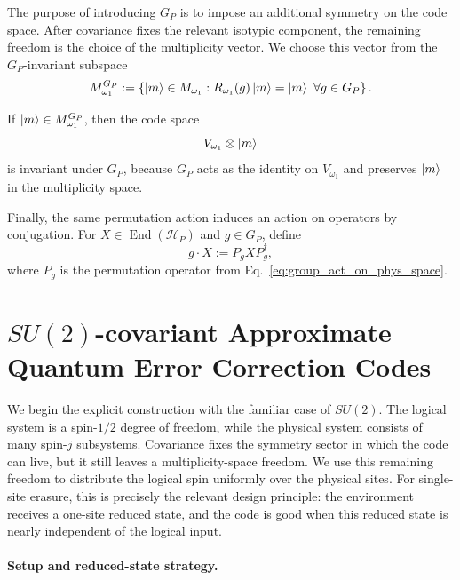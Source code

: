\documentclass[10pt,twocolumn,superscriptaddress,aps,amsmath,amssymb,citeautoscript,floatfix,prx]{revtex4-2}
\theoremstyle{plain}
\theoremstyle{plain}
\theoremstyle{plain}
\theoremstyle{plain}
\theoremstyle{plain}
\theoremstyle{plain}
\begin{document}
The purpose of introducing $G_P$ is to impose an additional symmetry on the code space. After covariance fixes the relevant isotypic component, the remaining freedom is the choice of the multiplicity vector. We choose this vector from the $G_P$-invariant subspace
\begin{equation}\label{eq:g_inv_subspace}
M_{\omega_1}^{G_P}
:=
\left\{
\ket m\in M_{\omega_1}
:
R_{\omega_1}(g)\ket m=\ket m
\ \forall g\in G_P
\right\}.
\end{equation}

If $\ket m\in M_{\omega_1}^{G_P}$, then the code space
$$
V_{\omega_1}\otimes\ket m
$$
is invariant under $G_P$, because $G_P$ acts as the identity on $V_{\omega_1}$ and preserves $\ket m$ in the multiplicity space.

Finally, the same permutation action induces an action on operators by conjugation. For $X\in\operatorname{End}(\mathcal H_P)$ and $g\in G_P$, define
\begin{equation}\label{eq:group_act_oper}
g\cdot X
:=
P_gXP_g^\dagger,
\end{equation}
where $P_g$ is the permutation operator from Eq.~\eqref{eq:group_act_on_phys_space}.

\section{\texorpdfstring{$SU(2)$}{SU(2)}-covariant Approximate Quantum Error Correction Codes}\label{sec:main_su2}

We begin the explicit construction with the familiar case of $SU(2)$. The logical system is a spin-$1/2$ degree of freedom, while the physical system consists of many spin-$j$ subsystems. Covariance fixes the symmetry sector in which the code can live, but it still leaves a multiplicity-space freedom. We use this remaining freedom to distribute the logical spin uniformly over the physical sites. For single-site erasure, this is precisely the relevant design principle: the environment receives a one-site reduced state, and the code is good when this reduced state is nearly independent of the logical input.

\paragraph{Setup and reduced-state strategy.}
\end{document}
